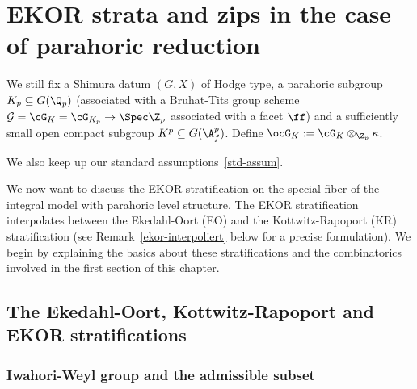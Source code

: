 \documentclass[a4paper]{scrartcl} %
\numberwithin{equation}{section}
\begin{document}
\section{EKOR strata and zips in the case of parahoric reduction}
\label{part:ekor-strata-zips}

\begin{Notation}
  We still fix a Shimura datum $(G,X)$ of Hodge type, a parahoric subgroup $K_p\subseteq G(\Q_p)$ (associated with a Bruhat-Tits group scheme $\mathcal{G}=\cG_K=\cG_{K_p}\to\Spec\Z_p$ associated with a facet $\ff$) and a sufficiently small open compact subgroup $K^p\subseteq G(\A_f^p)$. Define $\ocG_K:=\cG_K\otimes_{\Z_p}\kappa$.

  We also keep up our standard assumptions~\ref{std-assum}.
\end{Notation}

We now want to discuss the EKOR stratification on the special fiber of the integral model with parahoric level structure. The EKOR stratification interpolates between the Ekedahl-Oort (EO) and the Kottwitz-Rapoport (KR) stratification (see Remark~\ref{ekor-interpoliert} below for a precise formulation). We begin by explaining the basics about these stratifications and the combinatorics involved in the first section of this chapter.



\subsection{The Ekedahl-Oort, Kottwitz-Rapoport and EKOR stratifications}
\label{sec:eo-kr-ekor}


\subsubsection{Iwahori-Weyl group and the admissible subset}
\label{sec:iwahori-weyl-group}
\end{document}

